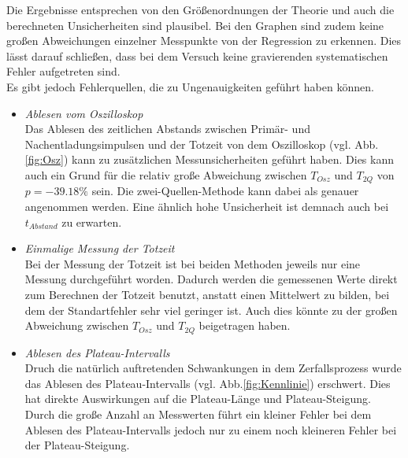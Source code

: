 \newpage
\noindent Die Ergebnisse entsprechen von den Größenordnungen der Theorie und auch die berechneten Unsicherheiten
sind plausibel. Bei den Graphen sind zudem keine großen Abweichungen einzelner Messpunkte von der 
Regression zu erkennen. Dies lässt darauf schließen, dass bei dem Versuch keine gravierenden systematischen
Fehler aufgetreten sind.
\\
Es gibt jedoch Fehlerquellen, die zu Ungenauigkeiten geführt haben können. 
\begin{itemize}
    \item \textit{Ablesen vom Oszilloskop}\\
        Das Ablesen des zeitlichen Abstands zwischen Primär- und Nachentladungsimpulsen und der Totzeit
        von dem Oszilloskop (vgl. Abb.\ref{fig:Osz}) kann zu zusätzlichen Messunsicherheiten geführt haben.
        Dies kann auch ein Grund für die relativ große Abweichung zwischen $T_{Osz}$ und 
        $T_{2Q}$ von $p=\num{-39.18}\%$ sein. Die zwei-Quellen-Methode kann dabei als 
        genauer angenommen werden. Eine ähnlich hohe Unsicherheit ist demnach auch bei $t_{Abstand}$
        zu erwarten. 
    \item \textit{Einmalige Messung der Totzeit}\\
        Bei der Messung der Totzeit ist bei beiden Methoden jeweils nur eine Messung durchgeführt worden.
        Dadurch werden die gemessenen Werte direkt zum Berechnen der Totzeit benutzt, anstatt einen 
        Mittelwert zu bilden, bei dem der Standartfehler sehr viel geringer ist. Auch dies könnte zu 
        der großen Abweichung zwischen $T_{Osz}$ und $T_{2Q}$ beigetragen haben.
    \item \textit{Ablesen des Plateau-Intervalls}\\
        Druch die natürlich auftretenden Schwankungen in dem Zerfallsprozess wurde das Ablesen des 
        Plateau-Intervalls (vgl. Abb.\ref{fig:Kennlinie}) erschwert. Dies hat direkte Auswirkungen auf
        die Plateau-Länge und Plateau-Steigung. Durch die große Anzahl an Messwerten führt ein kleiner
        Fehler bei dem Ablesen des Plateau-Intervalls jedoch nur zu einem noch kleineren Fehler bei der
        Plateau-Steigung.
\end{itemize}